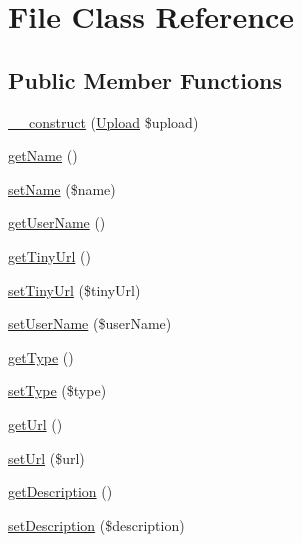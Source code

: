 \hypertarget{class_file}{\section{File Class Reference}
\label{class_file}
}
\subsection*{Public Member Functions}
\begin{DoxyCompactItemize}
\item 
\hyperlink{class_file_a2853c3bc6d33c76b60d853e46eec521a}{\+\_\+\+\_\+construct} (\hyperlink{class_upload}{Upload} \$upload)
\item 
\hyperlink{class_file_a3d0963e68bb313b163a73f2803c64600}{get\+Name} ()
\item 
\hyperlink{class_file_a2fe666694997d047711d7653eca2f132}{set\+Name} (\$name)
\item 
\hyperlink{class_file_aafd6d1ef27e6acc5833aba4012e5ee77}{get\+User\+Name} ()
\item 
\hyperlink{class_file_a091447bbcaa0d446868dad1498b44c01}{get\+Tiny\+Url} ()
\item 
\hyperlink{class_file_aa324ef58c503db9ab7a00323b15f3d91}{set\+Tiny\+Url} (\$tiny\+Url)
\item 
\hyperlink{class_file_a20f0087f72763b84d2992ba6ffee2fb2}{set\+User\+Name} (\$user\+Name)
\item 
\hyperlink{class_file_a830b5c75df72b32396701bc563fbe3c7}{get\+Type} ()
\item 
\hyperlink{class_file_ade096bf521b5d05dcaff2ba1a42e9f71}{set\+Type} (\$type)
\item 
\hyperlink{class_file_accd14bda49a1044b4d8dd93f020f11ee}{get\+Url} ()
\item 
\hyperlink{class_file_a0b6d0c531aa70b1811b166299edab8d0}{set\+Url} (\$url)
\item 
\hyperlink{class_file_a2e7bb35c71bf1824456ceb944cb7a845}{get\+Description} ()
\item 
\hyperlink{class_file_a31fad3e39336ea079ea758e051866627}{set\+Description} (\$description)
\end{DoxyCompactItemize}
